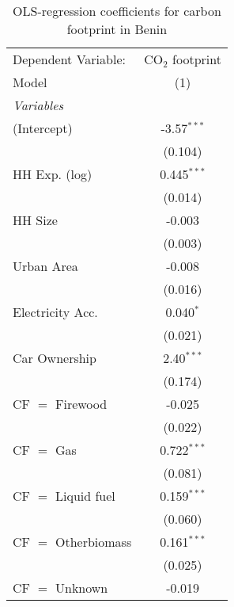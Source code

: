 
\begin{table}[htbp!]
   \centering
   \small
   \begin{adjustbox}{width = 1\textwidth, max height = 0.95\textheight, center}
      \begin{threeparttable}[b]
         \caption{\label{tab:OLS_2_BEN} OLS-regression coefficients for carbon footprint in Benin}
         \begin{tabular}{lc}
            \tabularnewline \midrule \midrule
            Dependent Variable: & CO$_{2}$ footprint\\  
            Model               & (1)\\  
            \midrule
            \emph{Variables}\\
            (Intercept)         & -3.57$^{***}$\\   
                                & (0.104)\\   
            HH Exp. (log)       & 0.445$^{***}$\\   
                                & (0.014)\\   
            HH Size             & -0.003\\   
                                & (0.003)\\   
            Urban Area          & -0.008\\   
                                & (0.016)\\   
            Electricity Acc.    & 0.040$^{*}$\\   
                                & (0.021)\\   
            Car Ownership       & 2.40$^{***}$\\   
                                & (0.174)\\   
            CF $=$ Firewood     & -0.025\\   
                                & (0.022)\\   
            CF $=$ Gas          & 0.722$^{***}$\\   
                                & (0.081)\\   
            CF $=$ Liquid fuel  & 0.159$^{***}$\\   
                                & (0.060)\\   
            CF $=$ Otherbiomass & 0.161$^{***}$\\   
                                & (0.025)\\   
            CF $=$ Unknown      & -0.019\\   

\end{tabular}
\end{threeparttable}
\end{adjustbox}
\end{table}
